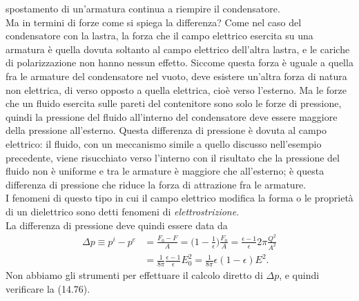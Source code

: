 \begin{enumerate}
    spostamento di un'armatura continua a riempire il condensatore.\\
    Ma in termini di forze come si spiega la differenza? Come nel caso del
    condensatore con la lastra, la forza che il campo elettrico esercita su una
    armatura \`e quella
    dovuta soltanto al campo elettrico dell'altra lastra, e le cariche di
    polarizzazione non hanno nessun effetto. Siccome questa forza \`e uguale a
    quella fra le armature del condensatore nel vuoto, deve esistere un'altra
    forza di natura non elettrica, di verso opposto a quella elettrica, cio\`e
    verso l'esterno. Ma le forze che un fluido esercita sulle pareti del
    contenitore sono solo le forze di pressione, quindi la pressione del fluido
    all'interno del condensatore deve essere maggiore della pressione
    all'esterno. Questa differenza di pressione \`e dovuta al campo elettrico:
    il fluido, con un meccanismo simile a quello discusso nell'esempio
    precedente, viene risucchiato verso l'interno con il risultato che la
    pressione del fluido non \`e uniforme e tra le armature \`e maggiore che
    all'esterno; \`e questa differenza di pressione che riduce la forza di
    attrazione fra le armature.\\
    I fenomeni di questo tipo in cui il campo elettrico modifica la forma o le
    propriet\`a di un dielettrico sono detti fenomeni di
    \textit{elettrostrizione}.\\
    La differenza di pressione deve quindi essere data da
    \begin{equation}
      \begin{aligned}
        \Delta p\equiv p^i-p^e
        &=\frac{F_0-F}{A}=\big(1-\frac{1}{\epsilon}\big)\frac{F_0}{A}
        =\frac{\epsilon-1}{\epsilon}2\pi\frac{Q^2}{A^2}\\
        &=\frac{1}{8\pi}\frac{\epsilon-1}{\epsilon}E_0^2
        =\frac{1}{8\pi}\epsilon(1-\epsilon)E^2.
      \end{aligned}
      \tag{14.76}
    \end{equation}
    Non abbiamo gli strumenti per effettuare il calcolo diretto di $\Delta p$, e
    quindi verificare la (14.76).
\end{enumerate}
